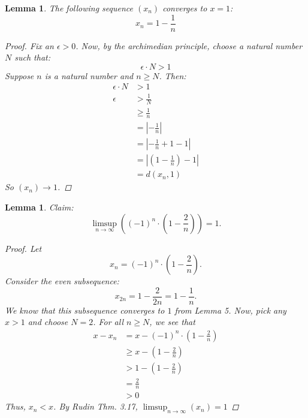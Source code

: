 \documentclass{amsart}
\newtheorem{lemma}[theorem]{Lemma}
\begin{document}
\begin{lemma} 
    The following sequence $(x_n)$ converges to $x = 1$:
    \[
        x_n = 1 - \frac{1}{n}    
    \]
    \begin{proof}
        Fix an $\epsilon > 0$. Now, by the archimedian principle, choose a natural number $N$ such that:
        \[
            \epsilon\cdot N > 1    
        \]
        Suppose $n$ is a natural number and $n \geq N$. Then:
        \begin{align*}
            \epsilon\cdot N &> 1 \\
            \epsilon &> \frac{1}{N} \\
            &\geq \frac{1}{n} \\
            &= \left| -\frac{1}{n}\right| \\
            &= \left| -\frac{1}{n} + 1 - 1\right| \\
            &= \left| \left(1 - \frac{1}{n} \right) - 1 \right| \\
            &= d(x_n, 1)
        \end{align*}
        So $(x_n) \to 1$.
    \end{proof}
\end{lemma}
\begin{lemma}
    Claim:
    \[
        \limsup_{n \to \infty} \left((-1)^n \cdot \left( 1 - \frac{2}{n} \right) \right) = 1.
    \]
    \begin{proof}
       Let 
       \[
            x_n = (-1)^n \cdot \left( 1 - \frac{2}{n} \right).
       \]
       Consider the even subsequence: 
       \[
            x_{2n} = 1 - \frac{2}{2n} = 1 - \frac{1}{n}.
       \]
       We know that this subsequence converges to $1$ from Lemma 5.
       Now, pick any $x > 1$ and choose $N = 2$. For all $n \geq N$, we see that
       \begin{align*}
            x - x_n &= x - (-1)^n \cdot \left( 1 - \frac{2}{n} \right) \\
            &\geq x - \left( 1 - \frac{2}{n} \right) \\
            &> 1 - \left( 1 - \frac{2}{n} \right) \\
            &= \frac{2}{n} \\
            &> 0
       \end{align*}
       Thus, $x_n < x$. By Rudin Thm. 3.17,  $\limsup_{n \to \infty} \left(x_n\right) = 1$
    \end{proof}
\end{lemma}
\end{document}
